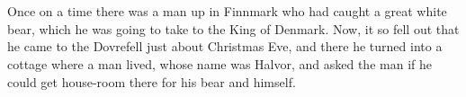 \chapter*{\englishabstractname}
%
Once on a time there was a man up in Finnmark who had caught a great white bear, which he was going to take to the King of Denmark. Now, it so fell out that he came to the Dovrefell just about Christmas Eve, and there he turned into a cottage where a man lived, whose name was Halvor, and asked the man if he could get house-room there for his bear and himself.
%
\newpage
